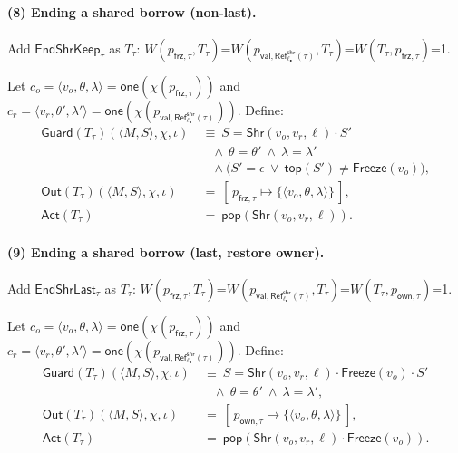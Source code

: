 \documentclass[sigconf]{acmart}
\begin{document}
\paragraph{(8) Ending a shared borrow (non-last).}
Add $\mathsf{EndShrKeep}_\tau$ as $T_\tau$:
$W(p_{\mathsf{frz},\tau},T_\tau)$=$W(p_{\mathsf{val},\mathsf{Ref}^{\mathsf{shr}}_{\ell_{\bullet}}(\tau)},T_\tau)$=$W(T_\tau,p_{\mathsf{frz},\tau})$=1.

Let $c_o=\langle v_o,\theta,\lambda\rangle=\mathsf{one}(\chi(p_{\mathsf{frz},\tau}))$ and
$c_r=\langle v_r,\theta',\lambda'\rangle=\mathsf{one}(\chi(p_{\mathsf{val},\mathsf{Ref}^{\mathsf{shr}}_{\ell_{\bullet}}(\tau)}))$.
Define:
\begin{align*}
\mathsf{Guard}(T_\tau)(\langle M,S\rangle,\chi,\iota)
&~\equiv~ S=\mathsf{Shr}(v_o,v_r,\ell)\cdot S' \\
&\quad \wedge\ \theta=\theta' \ \wedge\ \lambda=\lambda' \\ 
&\quad \wedge \big(S'=\epsilon\ \vee\ \mathsf{top}(S')\neq \mathsf{Freeze}(v_o)\big),\\
\mathsf{Out}(T_\tau)(\langle M,S\rangle,\chi,\iota)
&~=~ [\,p_{\mathsf{frz},\tau}\mapsto \{\langle v_o,\theta,\lambda\rangle\}\,],\\
\mathsf{Act}(T_\tau)
&~=~ \mathsf{pop}(\mathsf{Shr}(v_o,v_r,\ell)).
\end{align*}

\paragraph{(9) Ending a shared borrow (last, restore owner).}
Add $\mathsf{EndShrLast}_\tau$ as $T_\tau$:
$W(p_{\mathsf{frz},\tau},T_\tau)$=$W(p_{\mathsf{val},\mathsf{Ref}^{\mathsf{shr}}_{\ell_{\bullet}}(\tau)},T_\tau)$=$W(T_\tau,p_{\mathsf{own},\tau})$=1.

Let $c_o=\langle v_o,\theta,\lambda\rangle=\mathsf{one}(\chi(p_{\mathsf{frz},\tau}))$ and
$c_r=\langle v_r,\theta',\lambda'\rangle=\mathsf{one}(\chi(p_{\mathsf{val},\mathsf{Ref}^{\mathsf{shr}}_{\ell_{\bullet}}(\tau)}))$.
Define:
\begin{align*}
\mathsf{Guard}(T_\tau)(\langle M,S\rangle,\chi,\iota)
&~\equiv~ S=\mathsf{Shr}(v_o,v_r,\ell)\cdot \mathsf{Freeze}(v_o)\cdot S' \\
&\quad \wedge\ \theta=\theta' \ \wedge\ \lambda=\lambda',\\
\mathsf{Out}(T_\tau)(\langle M,S\rangle,\chi,\iota)
&~=~ [\,p_{\mathsf{own},\tau}\mapsto \{\langle v_o,\theta,\lambda\rangle\}\,],\\
\mathsf{Act}(T_\tau)
&~=~ \mathsf{pop}(\mathsf{Shr}(v_o,v_r,\ell)\cdot \mathsf{Freeze}(v_o)).
\end{align*}
\end{document}
